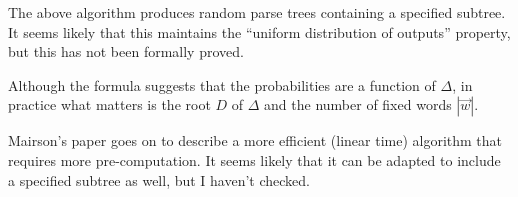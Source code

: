 \documentclass[10pt]{article}
\begin{document}
The above algorithm produces random parse trees containing a specified subtree.
It seems likely that this maintains the ``uniform distribution of outputs'' property, but this has not been formally proved.

Although the formula suggests that the probabilities are a function of $\Delta$, in practice what matters is the root $D$ of $\Delta$ and the number of fixed words $|\vec{w}|$.

Mairson's paper goes on to describe a more efficient (linear time) algorithm that requires more pre-computation. It seems likely that it can be adapted to include a specified subtree as well, but I haven't checked.
\end{document}
